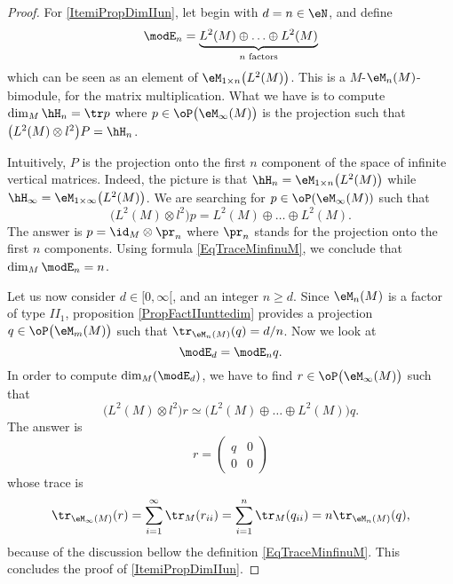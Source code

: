 \begin{proof}

	For \ref{ItemiPropDimIIun}, let begin with $d=n\in \eN$, and define
	\begin{equation}
        \modE_n=\underbrace{  L^2(M)\oplus\ldots\oplus L^2(M)   }_{n \text{ factors}}
	\end{equation}
	which can be seen as an element of $\eM_{1\times n}\big( L^2(M) \big)$. This is a $M$-$\eM_n(M)$-bimodule, for the matrix multiplication. What we have is to compute $\dim_{M}\hH_n=\tr p$ where $p\in\oP\big( \eM_{\infty}(M) \big)$ is the projection such that $\big( L^2(M)\otimes l^2 \big)P=\hH_n$. 
	
	Intuitively, $P$ is the projection onto the first $n$ component of the space of infinite vertical matrices. Indeed, the picture is that $\hH_n=\eM_{1\times n}\big( L^2(M) \big)$ while $\hH_{\infty}=\eM_{1\times \infty}\big( L^2(M) \big)$. We are searching for $p\in\oP(\eM_{\infty}(M))$ such that 
	\begin{equation}
		\big( L^2(M)\otimes l^2 \big)p=L^2(M)\oplus\ldots\oplus L^2(M).
	\end{equation}
	The answer is $p=\id_{M}\otimes \pr_n$ where $\pr_n$ stands for the projection onto the first $n$ components. Using formula \eqref{EqTraceMinfinuM}, we conclude that $\dim_M\modE_n=n$. 

	Let us now consider $d\in[0,\infty[$, and an integer $n\geq d$. Since $\eM_n(M)$ is a factor of type $II_1$, proposition \ref{PropFactIIunttedim} provides a projection $q\in\oP\big( \eM_m(M) \big)$ such that $\tr_{\eM_n(M)}(q)=d/n$. Now we look at
	\begin{equation}
		\modE_d=\modE_nq.
	\end{equation}
	In order to compute $\dim_M(\modE_d)$, we have to find $r\in\oP\big( \eM_{\infty}(M) \big)$ such that
	\begin{equation}
		\big( L^2(M)\otimes l^2 \big)r\simeq \big( L^2(M)\oplus\ldots\oplus L^2(M) \big)q.
	\end{equation}
	The answer is
	\begin{equation}
		r=
	\begin{pmatrix}
	  q	&	0	\\ 
	  0	&	0	
	\end{pmatrix}
	\end{equation}
	whose trace is 
	\begin{equation}
		\tr_{\eM_{\infty}(M)}(r)=\sum_{i=1}^{\infty}\tr_M(r_{ii})=\sum_{i=1}^n\tr_M(q_{ii})=n\tr_{\eM_n(M)}(q),
	\end{equation}
	because of the discussion bellow the definition \eqref{EqTraceMinfinuM}. This concludes the proof of \ref{ItemiPropDimIIun}.
	

\end{proof}
